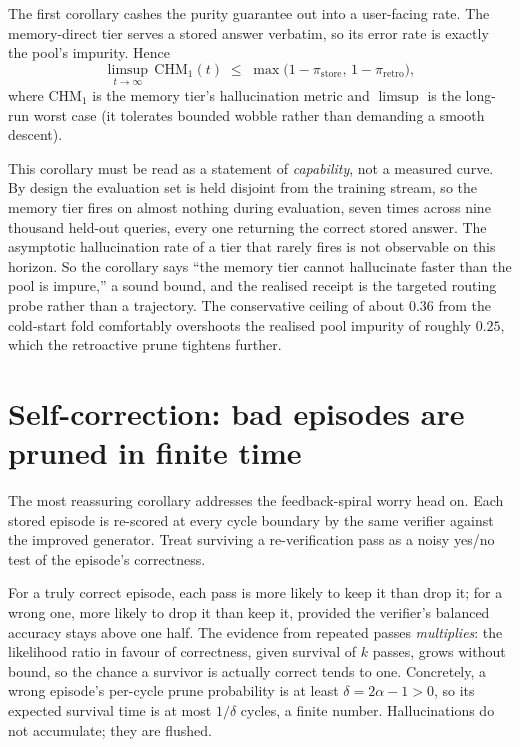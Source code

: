 The first corollary cashes the purity guarantee out into a user-facing rate. The
memory-direct tier serves a stored answer verbatim, so its error rate is exactly the
pool's impurity. Hence
\[
  \limsup_{t\to\infty}\, \mathrm{CHM}_1(t) \;\le\; \max\!\big(1-\pi_{\text{store}},\, 1-\pi_{\text{retro}}\big),
\]
where $\mathrm{CHM}_1$ is the memory tier's hallucination metric and $\limsup$ is the
long-run worst case (it tolerates bounded wobble rather than demanding a smooth descent).

\begin{pitfall}
This corollary must be read as a statement of \emph{capability}, not a measured curve. By
design the evaluation set is held disjoint from the training stream, so the memory tier
fires on almost nothing during evaluation, seven times across nine thousand held-out
queries, every one returning the correct stored answer. The asymptotic hallucination rate
of a tier that rarely fires is not observable on this horizon. So the corollary says ``the
memory tier cannot hallucinate faster than the pool is impure,'' a sound bound, and the
realised receipt is the targeted routing probe rather than a trajectory. The conservative
ceiling of about $0.36$ from the cold-start fold comfortably overshoots the realised pool
impurity of roughly $0.25$, which the retroactive prune tightens further.
\end{pitfall}

\section{Self-correction: bad episodes are pruned in finite time}
\label{sec:theory-selfcorrect}

The most reassuring corollary addresses the feedback-spiral worry head on. Each stored
episode is re-scored at every cycle boundary by the same verifier against the improved
generator. Treat surviving a re-verification pass as a noisy yes/no test of the episode's
correctness.

\begin{precise}
For a truly correct episode, each pass is more likely to keep it than drop it; for a wrong
one, more likely to drop it than keep it, provided the verifier's balanced accuracy stays
above one half. The evidence from repeated passes \emph{multiplies}: the likelihood ratio
in favour of correctness, given survival of $k$ passes, grows without bound, so the chance
a survivor is actually correct tends to one. Concretely, a wrong episode's per-cycle prune
probability is at least $\delta = 2\alpha - 1 > 0$, so its expected survival time is at most
$1/\delta$ cycles, a finite number. Hallucinations do not accumulate; they are flushed.
\end{precise}

